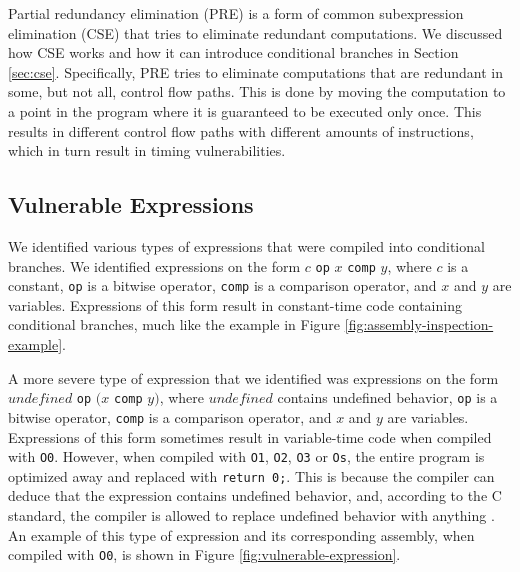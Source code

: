 Partial redundancy elimination (PRE) is a form of common subexpression elimination (CSE) that tries to eliminate redundant computations. 
We discussed how CSE works and how it can introduce conditional branches in Section \ref{sec:cse}.
Specifically, PRE tries to eliminate computations that are redundant in some, but not all, control flow paths.
This is done by moving the computation to a point in the program where it is guaranteed to be executed only once.
This results in different control flow paths with different amounts of instructions, which in turn result in timing vulnerabilities.

\subsection{Vulnerable Expressions}
\label{sec:vulnerable-expressions}
We identified various types of expressions that were compiled into conditional branches.
We identified expressions on the form $c$ \texttt{op} $x$ \texttt{comp} $y$, where $c$ is a constant, \texttt{op} is a bitwise operator, \texttt{comp} is a comparison operator, and $x$ and $y$ are variables.
Expressions of this form result in constant-time code containing conditional branches, much like the example in Figure \ref{fig:assembly-inspection-example}.

A more severe type of expression that we identified was expressions on the form $undefined$ \texttt{op} $(x$ \texttt{comp} $y)$, where $undefined$ contains undefined behavior, \texttt{op} is a bitwise operator, \texttt{comp} is a comparison operator, and $x$ and $y$ are variables. 
Expressions of this form sometimes result in variable-time code when compiled with \texttt{O0}.
However, when compiled with \texttt{O1}, \texttt{O2}, \texttt{O3} or \texttt{Os}, the entire program is optimized away and replaced with \texttt{return 0;}.
This is because the compiler can deduce that the expression contains undefined behavior, and, according to the C standard, the compiler is allowed to replace undefined behavior with anything \citep{c-standard}.
An example of this type of expression and its corresponding assembly, when compiled with \texttt{O0}, is shown in Figure \ref{fig:vulnerable-expression}.

